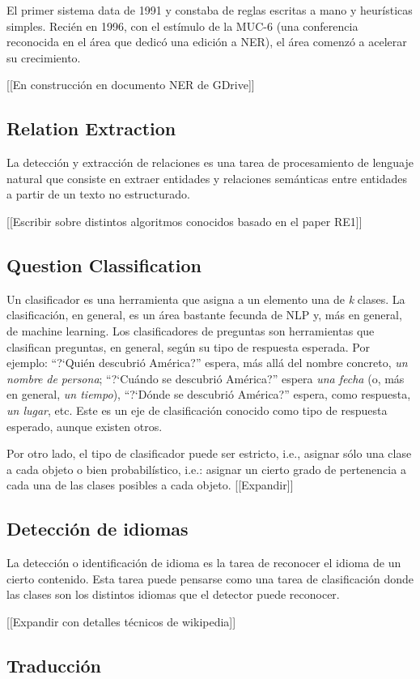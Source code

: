 El primer sistema data de 1991 y constaba de reglas escritas a mano y
heur\'isticas simples. Reci\'en en 1996, con el est\'imulo de la MUC-6
(una conferencia reconocida en el \'area que dedic\'o una edici\'on a
NER), el \'area comenz\'o a acelerar su crecimiento.

[[En construcci\'on en documento NER de GDrive]]

\subsection{Relation Extraction}

La detecci\'on y extracci\'on de relaciones es una tarea de procesamiento
de lenguaje natural que consiste en extraer entidades y relaciones sem\'anticas
entre entidades a partir de un texto no estructurado. 

[[Escribir sobre distintos algoritmos conocidos basado en el paper RE1]]

\subsection{Question Classification}

Un clasificador es una herramienta que asigna a un elemento una de
\textit{k }clases. La clasificaci\'on, en general, es un \'area
bastante fecunda de NLP y, m\'as en general, de machine learning. Los
clasificadores de preguntas son herramientas que clasifican preguntas,
en general, seg\'un su tipo de respuesta esperada. Por ejemplo:
{\textquotedblleft}?`Qui\'en descubri\'o Am\'erica?{\textquotedblright}
espera, m\'as all\'a del nombre concreto, \textit{un nombre} \textit{de
persona}; {\textquotedblleft}?`Cu\'ando se descubri\'o
Am\'erica?{\textquotedblright} espera \textit{una fecha} (o, m\'as en
general, \textit{un tiempo}), {\textquotedblleft}?`D\'onde se
descubri\'o Am\'erica?{\textquotedblright} espera, como respuesta,
\textit{un lugar}, etc. Este es un eje de clasificaci\'on conocido como
tipo de respuesta esperado, aunque existen otros.

Por otro lado, el tipo de clasificador puede ser estricto, i.e., asignar
s\'olo una clase a cada objeto o bien probabil\'istico, i.e.: asignar
un cierto grado de pertenencia a cada una de las clases posibles a
cada objeto. 
[[Expandir]]


\subsection{Detección de idiomas}
La detecci\'on o identificaci\'on de idioma es la tarea de reconocer el
idioma de un cierto contenido. Esta tarea puede pensarse como una
tarea de clasificaci\'on donde las clases son los distintos
idiomas que el detector puede reconocer. 

[[Expandir con detalles t\'ecnicos de wikipedia]]

\subsection{Traducci\'on}

